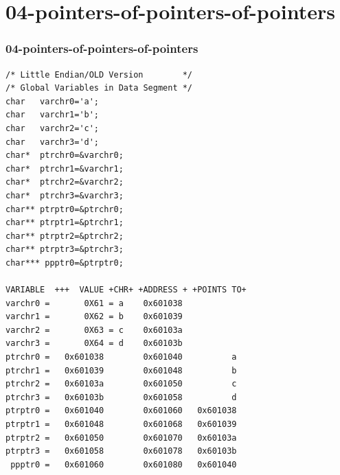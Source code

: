 \documentclass[xcolor=table, notheorems, hyperref={pdfpagelabels=false}]{beamer}
\begin{document}
\section{04-pointers-of-pointers-of-pointers}
\begin{frame}[fragile]
\frametitle{04-pointers-of-pointers-of-pointers}
\begin{lstlisting}[basicstyle=\ttfamily\tiny]
/* Little Endian/OLD Version        */
/* Global Variables in Data Segment */
char   varchr0='a';
char   varchr1='b';
char   varchr2='c';
char   varchr3='d';
char*  ptrchr0=&varchr0;
char*  ptrchr1=&varchr1;
char*  ptrchr2=&varchr2;
char*  ptrchr3=&varchr3;
char** ptrptr0=&ptrchr0;
char** ptrptr1=&ptrchr1;
char** ptrptr2=&ptrchr2;
char** ptrptr3=&ptrchr3;
char*** ppptr0=&ptrptr0;

VARIABLE  +++  VALUE +CHR+ +ADDRESS + +POINTS TO+ 
varchr0 =       0X61 = a    0x601038
varchr1 =       0X62 = b    0x601039
varchr2 =       0X63 = c    0x60103a
varchr3 =       0X64 = d    0x60103b
ptrchr0 =   0x601038        0x601040          a
ptrchr1 =   0x601039        0x601048          b
ptrchr2 =   0x60103a        0x601050          c
ptrchr3 =   0x60103b        0x601058          d
ptrptr0 =   0x601040        0x601060   0x601038
ptrptr1 =   0x601048        0x601068   0x601039
ptrptr2 =   0x601050        0x601070   0x60103a
ptrptr3 =   0x601058        0x601078   0x60103b
 ppptr0 =   0x601060        0x601080   0x601040
\end{lstlisting}

\end{frame}
\end{document}

